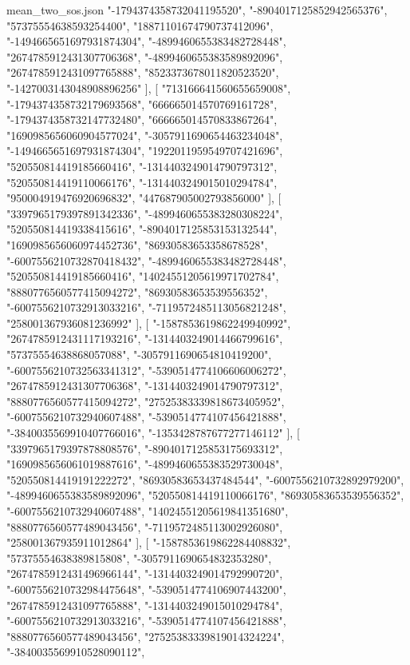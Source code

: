 \begin{filecontents*}[overwrite]{mean_two_sos.json}
    "-1794374358732041195520",
    "-8904017125852942565376",
    "57375554638593254400",
    "18871101674790737412096",
    "-1494665651697931874304",
    "-4899460655383482728448",
    "2674785912431307706368",
    "-4899460655383589892096",
    "2674785912431097765888",
    "8523373678011820523520",
    "-1427003143048908896256"
   ],
   [
    "713166641560655659008",
    "-1794374358732179693568",
    "666665014570769161728",
    "-1794374358732147732480",
    "666665014570833867264",
    "1690985656060904577024",
    "-3057911690654463234048",
    "-1494665651697931874304",
    "1922011959549707421696",
    "520550814419185660416",
    "-1314403249014790797312",
    "520550814419110066176",
    "-1314403249015010294784",
    "950004919476920696832",
    "447687905002793856000"
   ],
   [
    "3397965179397891342336",
    "-4899460655383280308224",
    "520550814419338415616",
    "-8904017125853153132544",
    "1690985656060974452736",
    "86930583653358678528",
    "-6007556210732870418432",
    "-4899460655383482728448",
    "520550814419185660416",
    "14024551205619971702784",
    "8880776560577415094272",
    "86930583653539556352",
    "-6007556210732913033216",
    "-7119572485113056821248",
    "258001367936081236992"
   ],
   [
    "-1587853619862249940992",
    "2674785912431117193216",
    "-1314403249014466799616",
    "57375554638868057088",
    "-3057911690654810419200",
    "-6007556210732563341312",
    "-5390514774106606006272",
    "2674785912431307706368",
    "-1314403249014790797312",
    "8880776560577415094272",
    "27525383339818673405952",
    "-6007556210732940607488",
    "-5390514774107456421888",
    "-3840035569910407766016",
    "-1353428787677277146112"
   ],
   [
    "3397965179397878808576",
    "-8904017125853175693312",
    "1690985656061019887616",
    "-4899460655383529730048",
    "520550814419191222272",
    "86930583653437484544",
    "-6007556210732892979200",
    "-4899460655383589892096",
    "520550814419110066176",
    "86930583653539556352",
    "-6007556210732940607488",
    "14024551205619841351680",
    "8880776560577489043456",
    "-7119572485113002926080",
    "258001367935911012864"
   ],
   [
    "-1587853619862284408832",
    "57375554638389815808",
    "-3057911690654832353280",
    "2674785912431496966144",
    "-1314403249014792990720",
    "-6007556210732984475648",
    "-5390514774106907443200",
    "2674785912431097765888",
    "-1314403249015010294784",
    "-6007556210732913033216",
    "-5390514774107456421888",
    "8880776560577489043456",
    "27525383339819014324224",
    "-3840035569910528090112",

\end{filecontents*}
